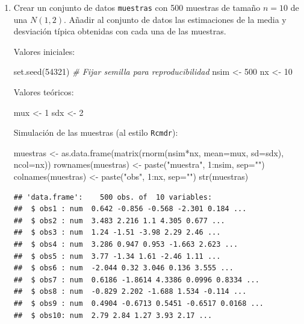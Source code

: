 \documentclass[
]{book}
\newenvironment{Shaded}{\begin{snugshade}}{\end{snugshade}}
\newcommand{\AttributeTok}[1]{\textcolor[rgb]{0.77,0.63,0.00}{#1}}
\newcommand{\CommentTok}[1]{\textcolor[rgb]{0.56,0.35,0.01}{\textit{#1}}}
\newcommand{\DecValTok}[1]{\textcolor[rgb]{0.00,0.00,0.81}{#1}}
\newcommand{\FunctionTok}[1]{\textcolor[rgb]{0.00,0.00,0.00}{#1}}
\newcommand{\NormalTok}[1]{#1}
\newcommand{\OtherTok}[1]{\textcolor[rgb]{0.56,0.35,0.01}{#1}}
\newcommand{\SpecialCharTok}[1]{\textcolor[rgb]{0.00,0.00,0.00}{#1}}
\newcommand{\StringTok}[1]{\textcolor[rgb]{0.31,0.60,0.02}{#1}}
\theoremstyle{break}
\theoremstyle{definition}
\theoremstyle{definition}
\theoremstyle{definition}
\theoremstyle{definition}
\theoremstyle{remark}
\begin{document}
\begin{enumerate}
\def\labelenumi{\alph{enumi})}
\item
  Crear un conjunto de datos \texttt{muestras} con 500 muestras de tamaño
  \(n=10\) de una \(N(1,2)\). Añadir al conjunto de datos las
  estimaciones de la media y desviación típica obtenidas con cada
  una de las muestras.

  Valores iniciales:

\begin{Shaded}
\begin{Highlighting}[]
\FunctionTok{set.seed}\NormalTok{(}\DecValTok{54321}\NormalTok{) }\CommentTok{\# Fijar semilla para reproducibilidad}
\NormalTok{nsim }\OtherTok{\textless{}{-}} \DecValTok{500}
\NormalTok{nx }\OtherTok{\textless{}{-}} \DecValTok{10}
\end{Highlighting}
\end{Shaded}

  Valores teóricos:

\begin{Shaded}
\begin{Highlighting}[]
\NormalTok{mux }\OtherTok{\textless{}{-}} \DecValTok{1}
\NormalTok{sdx }\OtherTok{\textless{}{-}} \DecValTok{2}
\end{Highlighting}
\end{Shaded}

  Simulación de las muestras (al estilo \texttt{Rcmdr}):

\begin{Shaded}
\begin{Highlighting}[]
\NormalTok{muestras }\OtherTok{\textless{}{-}} \FunctionTok{as.data.frame}\NormalTok{(}\FunctionTok{matrix}\NormalTok{(}\FunctionTok{rnorm}\NormalTok{(nsim}\SpecialCharTok{*}\NormalTok{nx, }\AttributeTok{mean=}\NormalTok{mux, }\AttributeTok{sd=}\NormalTok{sdx), }\AttributeTok{ncol=}\NormalTok{nx))}
\FunctionTok{rownames}\NormalTok{(muestras) }\OtherTok{\textless{}{-}} \FunctionTok{paste}\NormalTok{(}\StringTok{"muestra"}\NormalTok{, }\DecValTok{1}\SpecialCharTok{:}\NormalTok{nsim, }\AttributeTok{sep=}\StringTok{""}\NormalTok{)}
\FunctionTok{colnames}\NormalTok{(muestras) }\OtherTok{\textless{}{-}} \FunctionTok{paste}\NormalTok{(}\StringTok{"obs"}\NormalTok{, }\DecValTok{1}\SpecialCharTok{:}\NormalTok{nx, }\AttributeTok{sep=}\StringTok{""}\NormalTok{)}
\FunctionTok{str}\NormalTok{(muestras)}
\end{Highlighting}
\end{Shaded}

\begin{verbatim}
## 'data.frame':    500 obs. of  10 variables:
##  $ obs1 : num  0.642 -0.856 -0.568 -2.301 0.184 ...
##  $ obs2 : num  3.483 2.216 1.1 4.305 0.677 ...
##  $ obs3 : num  1.24 -1.51 -3.98 2.29 2.46 ...
##  $ obs4 : num  3.286 0.947 0.953 -1.663 2.623 ...
##  $ obs5 : num  3.77 -1.34 1.61 -2.46 1.11 ...
##  $ obs6 : num  -2.044 0.32 3.046 0.136 3.555 ...
##  $ obs7 : num  0.6186 -1.8614 4.3386 0.0996 0.8334 ...
##  $ obs8 : num  -0.829 2.202 -1.688 1.534 -0.114 ...
##  $ obs9 : num  0.4904 -0.6713 0.5451 -0.6517 0.0168 ...
##  $ obs10: num  2.79 2.84 1.27 3.93 2.17 ...
\end{verbatim}


\end{enumerate}
\end{document}

